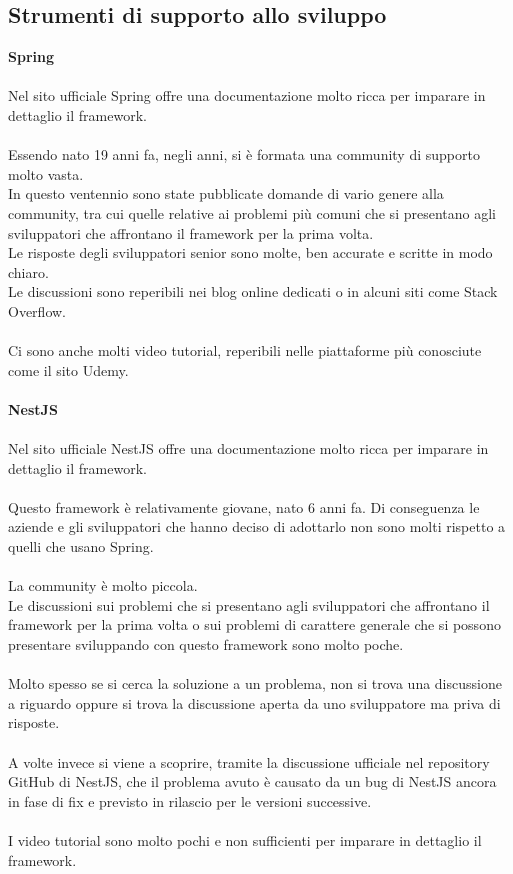 \subsection{Strumenti di supporto allo sviluppo}
\textbf{Spring}
\\\\
Nel sito ufficiale Spring offre una documentazione molto ricca per imparare in dettaglio il framework.
\\\\
Essendo nato 19 anni fa, negli anni, si è formata una community di supporto molto vasta. 
\\
In questo ventennio sono state pubblicate domande di vario genere alla community, tra cui quelle relative 
ai problemi più comuni che si presentano agli sviluppatori
che affrontano il framework per la prima volta. 
\\
Le risposte degli sviluppatori senior sono molte, ben accurate e scritte in modo chiaro.
\\
Le discussioni sono reperibili nei blog online dedicati o in alcuni siti come Stack Overflow. 
\\\\
Ci sono anche molti video tutorial, reperibili nelle piattaforme più conosciute come il sito Udemy.
\\\\
\textbf{NestJS}
\\\\
Nel sito ufficiale NestJS offre una documentazione molto ricca per imparare in dettaglio il framework.
\\\\
Questo framework è relativamente giovane, nato 6 anni fa. Di conseguenza le aziende e gli sviluppatori che hanno
deciso di adottarlo non sono molti rispetto a quelli che usano Spring.
\\\\
La community è molto piccola.
\\
Le discussioni sui problemi che si presentano agli sviluppatori che affrontano il framework per la prima volta
o sui problemi di carattere generale che si possono presentare sviluppando con questo framework sono molto poche. 
\\\\
Molto spesso se si cerca la soluzione a un problema, non si trova una discussione
a riguardo oppure si trova la discussione aperta da uno sviluppatore ma priva di risposte.
\\\\
A volte invece si viene a scoprire, tramite la discussione ufficiale nel repository GitHub di NestJS, che il 
problema avuto è causato da un bug di NestJS ancora in fase di fix e previsto in rilascio per le versioni
successive.
\\\\
I video tutorial sono molto pochi e non sufficienti per imparare in dettaglio il framework.

